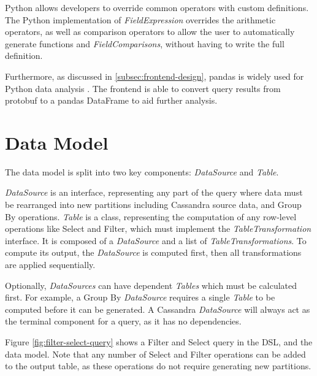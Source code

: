 Python allows developers to override common operators with custom definitions. The Python implementation of \textit{FieldExpression} overrides the arithmetic operators, as well as comparison operators to allow the user to automatically generate functions and \textit{FieldComparisons}, without having to write the full definition. %

Furthermore, as discussed in \ref{subsec:frontend-design}, pandas is widely used for Python data analysis \cite{reback2020pandas}. The frontend is able to convert query results from protobuf to a pandas DataFrame to aid further analysis.


\pagebreak
\section{Data Model}\label{subsec:data-model}
The data model is split into two key components: \textit{DataSource} and \textit{Table}. 

\textit{DataSource} is an interface, representing any part of the query where data must be rearranged into new partitions including Cassandra source data, and Group By operations. \textit{Table} is a class, representing the computation of any row-level operations like Select and Filter, which must implement the \textit{TableTransformation} interface. It is composed of a \textit{DataSource} and a list of \textit{TableTransformations}. To compute its output, the \textit{DataSource} is computed first, then all transformations are applied sequentially.

Optionally, \textit{DataSources} can have dependent \textit{Tables} which must be calculated first. For example, a Group By \textit{DataSource} requires a single \textit{Table} to be computed before it can be generated. A Cassandra \textit{DataSource} will always act as the terminal component for a query, as it has no dependencies.

Figure \ref{fig:filter-select-query} shows a Filter and Select query in the DSL, and the data model. Note that any number of Select and Filter operations can be added to the output table, as these operations do not require generating new partitions.

